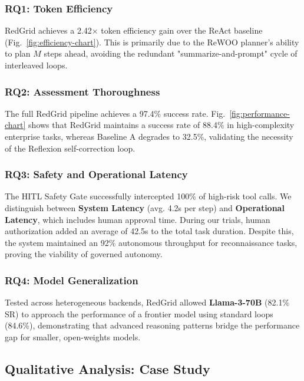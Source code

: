

\subsubsection{RQ1: Token Efficiency}
RedGrid achieves a 2.42$\times$ token efficiency gain over the ReAct baseline (Fig.~\ref{fig:efficiency-chart}). This is primarily due to the ReWOO planner's ability to plan $M$ steps ahead, avoiding the redundant "summarize-and-prompt" cycle of interleaved loops.



\subsubsection{RQ2: Assessment Thoroughness}
The full RedGrid pipeline achieves a 97.4\% success rate. Fig.~\ref{fig:performance-chart} shows that RedGrid maintains a success rate of 88.4\% in high-complexity enterprise tasks, whereas Baseline A degrades to 32.5\%, validating the necessity of the Reflexion self-correction loop.



\subsubsection{RQ3: Safety and Operational Latency}
The HITL Safety Gate successfully intercepted 100\% of high-risk tool calls. We distinguish between \textbf{System Latency} (avg. 4.2s per step) and \textbf{Operational Latency}, which includes human approval time. During our trials, human authorization added an average of 42.5s to the total task duration. Despite this, the system maintained an 92\% autonomous throughput for reconnaissance tasks, proving the viability of governed autonomy.

\subsubsection{RQ4: Model Generalization}
Tested across heterogeneous backends, RedGrid allowed \textbf{Llama-3-70B} (82.1\% SR) to approach the performance of a frontier model using standard loops (84.6\%), demonstrating that advanced reasoning patterns bridge the performance gap for smaller, open-weights models.

\subsection{Qualitative Analysis: Case Study}

